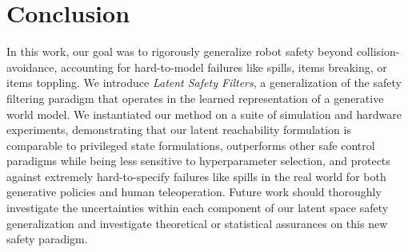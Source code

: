 \section{Conclusion}
In this work, our goal was to rigorously generalize robot safety beyond collision-avoidance, accounting for hard-to-model failures like spills, items breaking, or items toppling. 
We introduce \textit{Latent Safety Filters}, a generalization of the safety filtering paradigm that operates in the learned representation of a generative world model. We instantiated our method on a suite of simulation and hardware experiments, demonstrating that our latent reachability formulation is comparable to privileged state formulations, outperforms other safe control paradigms while being less sensitive to hyperparameter selection, and protects against extremely hard-to-specify failures like spills in the real world for both generative policies and human teleoperation. 
Future work should thoroughly investigate the uncertainties within each component of our latent space safety generalization and investigate theoretical or statistical assurances on this new safety paradigm. 

